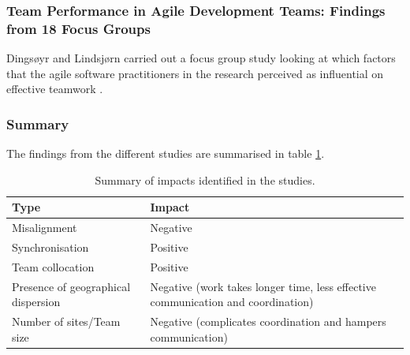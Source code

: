 \subsubsection{Team Performance in Agile Development Teams: Findings from 18 Focus Groups}


Dingsøyr and Lindsjørn carried out a focus group study looking at which factors that the agile software practitioners in the research perceived as influential on effective teamwork \cite{Dingsoyr2013c}.

\subsubsection{Summary}

The findings from the different studies are summarised in table \ref{summary}.

\begin{table}[H]
\begin{center}
    \begin{tabular}{ | p{5cm} | p{8cm} |}
    \hline
    \textbf{Type} & \textbf{Impact} \\ \hline
    Misalignment & Negative \\ \hline
    Synchronisation & Positive \\ \hline
    Team collocation & Positive \\ \hline
    Presence of geographical dispersion & Negative (work takes longer time, less effective communication and coordination) \\ \hline
    Number of sites/Team size & Negative (complicates coordination and hampers communication) \\ \hline
    \end{tabular}
    \caption{Summary of impacts identified in the studies.}
    \label{summary}
\end{center}
\end{table}